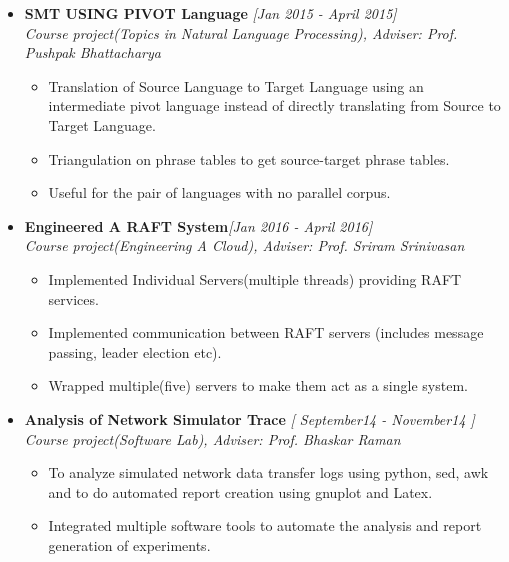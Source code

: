 \documentclass[a4paper,10pt]{article}
\newenvironment{changemargin}[2]{%
	\begin{list}{}{%
			\setlength{\topsep}{0pt}%
			\setlength{\leftmargin}{#1}%
			\setlength{\rightmargin}{#2}%
			\setlength{\listparindent}{\parindent}%
			\setlength{\parsep}{\parskip}%
		}%
		\item[]}{\end{list}
}
\newenvironment{body} {
	\vspace*{-16pt}
	\begin{changemargin}{-0.0in}{-0.in}
	}	
	{\end{changemargin}
}
\begin{document}
\begin{body}
\begin{itemize}
			\vspace{-1ex}
			
			\item  \textbf{SMT USING PIVOT Language} \hfill \emph{[Jan 2015 - April 2015]}\\
			\emph{Course project(Topics in Natural Language Processing), Adviser: Prof. Pushpak Bhattacharya}
			\vspace{-1ex}
			\begin{itemize}
				\setlength{\itemindent}{0em}
				\item Translation of Source Language to Target Language using an intermediate pivot language instead of directly translating from Source to Target Language.
				\vspace{-0.5ex}
				\item Triangulation on phrase tables to get source-target phrase tables.
				\vspace{-0.5ex}
				\item Useful for the pair of languages with no parallel corpus.
			\end{itemize}
			\vspace{-1ex}
			\item \textbf{Engineered A RAFT System}\hfill \emph{[Jan 2016 - April 2016]} \\
			\emph{Course project(Engineering A Cloud), Adviser: Prof. Sriram Srinivasan}
			\vspace{-1ex}
			\begin{itemize}
				\setlength{\itemindent}{0em}
				\item Implemented Individual Servers(multiple threads) providing RAFT services.
				\vspace{-0.5ex}
				\item Implemented communication between RAFT servers (includes message passing, leader election etc).
				\vspace{-0.5ex}
				\item Wrapped multiple(five) servers to make them act as a single system.
				\vspace{-0.5ex}
			\end{itemize}
			
			\item \textbf{Analysis of Network Simulator Trace} \hfill \emph{[ September14 - November14 ]}
			\\
			\emph{Course project(Software Lab), Adviser: Prof. Bhaskar Raman} \hfill  \\
			\vspace{-1ex}
			\begin{itemize}
				\setlength{\itemindent}{0em}
				\item To analyze simulated network data transfer logs using python, sed, awk and to do automated report creation using gnuplot and Latex. \\
				\vspace{-0.5ex}
				\item Integrated multiple software tools to automate the analysis and report generation of experiments. \\[-0.6cm]
			\end{itemize}
			

\end{itemize}
\end{body}
\end{document}
